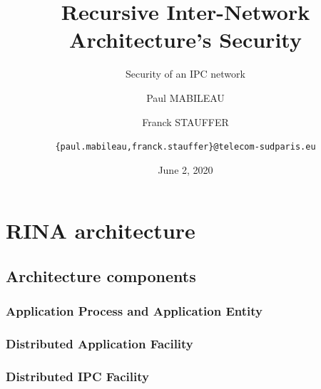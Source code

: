 \documentclass[aspectratio=169]{beamer}
\author[MABILEAU, STAUFFER]{Paul MABILEAU
\and
Franck STAUFFER
\and 
\texttt{\{paul.mabileau,franck.stauffer\}@telecom-sudparis.eu}}
\institute[TSP]{TELECOM SudParis}
\title[RINA's security]{Recursive Inter-Network Architecture's Security}
\subtitle{Security of an IPC network}
\date[2020/06/02]{June 2, 2020}
\begin{document}
\maketitle
{}

\section{RINA architecture}

\subsection{Architecture components}

\begin{frame}
    \frametitle{Application Process and Application Entity}
\end{frame}

\begin{frame}
    \frametitle{Distributed Application Facility}
\end{frame}

\begin{frame}
    \frametitle{Distributed IPC Facility}
\end{frame}
\end{document}
